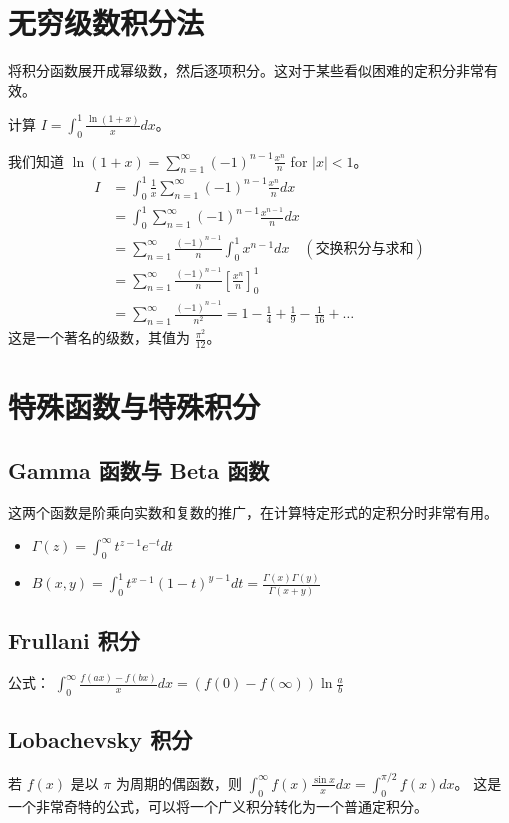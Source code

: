 \documentclass[lang=cn,newtx,10pt,scheme=chinese]{elegantbook}
\begin{document}
\begin{solution}
\section{无穷级数积分法}
将积分函数展开成幂级数，然后逐项积分。这对于某些看似困难的定积分非常有效。
\begin{problem}
    计算 $I = \int_0^1 \frac{\ln(1+x)}{x} dx$。
\end{problem}
\begin{solution}
    我们知道 $\ln(1+x) = \sum_{n=1}^\infty (-1)^{n-1} \frac{x^n}{n}$ for $|x|<1$。
    \begin{align*}
        I &= \int_0^1 \frac{1}{x} \sum_{n=1}^\infty (-1)^{n-1} \frac{x^n}{n} dx \\
        &= \int_0^1 \sum_{n=1}^\infty (-1)^{n-1} \frac{x^{n-1}}{n} dx \\
        &= \sum_{n=1}^\infty \frac{(-1)^{n-1}}{n} \int_0^1 x^{n-1} dx \quad (\text{交换积分与求和}) \\
        &= \sum_{n=1}^\infty \frac{(-1)^{n-1}}{n} \left[ \frac{x^n}{n} \right]_0^1 \\
        &= \sum_{n=1}^\infty \frac{(-1)^{n-1}}{n^2} = 1 - \frac{1}{4} + \frac{1}{9} - \frac{1}{16} + \dots
    \end{align*}
    这是一个著名的级数，其值为 $\frac{\pi^2}{12}$。
\end{solution}

\section{特殊函数与特殊积分}
\subsection{Gamma 函数与 Beta 函数}
这两个函数是阶乘向实数和复数的推广，在计算特定形式的定积分时非常有用。
\begin{itemize}
    \item $\Gamma(z) = \int_0^\infty t^{z-1}e^{-t} dt$
    \item $B(x, y) = \int_0^1 t^{x-1}(1-t)^{y-1} dt = \frac{\Gamma(x)\Gamma(y)}{\Gamma(x+y)}$
\end{itemize}

\subsection{Frullani 积分}
公式： $\int_0^\infty \frac{f(ax) - f(bx)}{x} dx = (f(0) - f(\infty)) \ln\frac{a}{b}$

\subsection{Lobachevsky 积分}
若 $f(x)$ 是以 $\pi$ 为周期的偶函数，则 $\int_0^\infty f(x) \frac{\sin x}{x} dx = \int_0^{\pi/2} f(x) dx$。
这是一个非常奇特的公式，可以将一个广义积分转化为一个普通定积分。


\end{solution}
\end{document}
